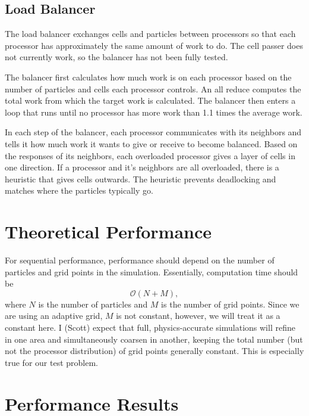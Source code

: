 \documentclass[]{article}
\begin{document}
\subsection{Load Balancer}
The load balancer exchanges cells and particles between processors so that each processor has approximately the same amount of work to do.  The cell passer does not currently work, so the balancer has not been fully tested.

The balancer first calculates how much work is on each processor based on the number of particles and cells each processor controls.  An all reduce computes the total work from which the target work is calculated.  The balancer then enters a loop that runs until no processor has more work than 1.1 times the average work.

In each step of the balancer, each processor communicates with its neighbors and tells it how much work it wants to give or receive to become balanced.  Based on the responses of its neighbors, each overloaded processor gives a layer of cells in one direction.  If a processor and it's neighbors are all overloaded, there is a heuristic that gives cells outwards.  The heuristic prevents deadlocking and matches where the particles typically go.


\section{Theoretical Performance}
For sequential performance, performance should depend on the number of particles and grid points in the simulation.  Essentially, computation time should be 
\begin{equation}
\mathcal{O}(N + M),
\end{equation}
where $N$ is the number of particles and $M$ is the number of grid points.  Since we are using an adaptive grid, $M$ is not constant, however, we will treat it as a constant here.  I (Scott) expect that full, physics-accurate simulations will refine in one area and simultaneously coarsen in another, keeping the total number (but not the processor distribution) of grid points generally constant.  This is especially true for our test problem.

\section{Performance Results}
\end{document}
